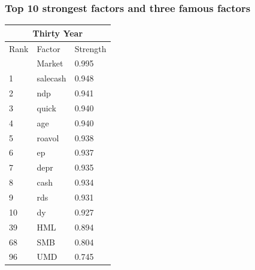\documentclass[12pt]{beamer}
\begin{document}
\begin{frame}[shrink = 20]
		\frametitle{Top 10 strongest factors and three famous factors}
\begin{center}
	\begin{tabular}{lll}
	
	\hline
	\multicolumn{3}{c}{Thirty Year} \\ \hline
	Rank   & Factor     & Strength  \\ \hline
	& Market     & 0.995     \\
	1      & salecash   & 0.948     \\
	2      & ndp        & 0.941     \\
	3      & quick      & 0.940     \\
	4      & age        & 0.940     \\
	5      & roavol     & 0.938     \\
	6      & ep         & 0.937     \\
	7      & depr       & 0.935     \\
	8      & cash       & 0.934     \\
	9      & rds        & 0.931     \\
	10     & dy         & 0.927     \\
	39     & HML        & 0.894     \\
	68     & SMB        & 0.804     \\
	96     & UMD        & 0.745     \\ 
	\hline
\end{tabular}
\end{center}


\end{frame}
\end{document}
